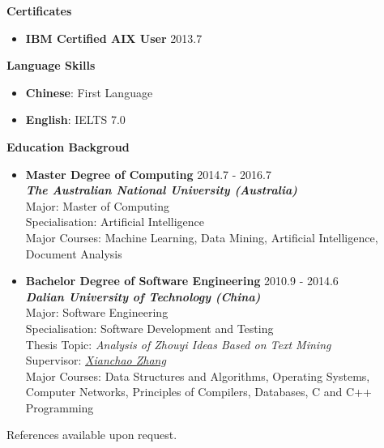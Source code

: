 \documentclass{res}
\newcommand{\resheading}[1]{{\normalsize \colorbox{mygrey}{\begin{minipage}{\textwidth}{\textbf{#1 \vphantom{p\^{E}}}}\end{minipage}}}}
\begin{document}
\begin{resume}
\begin{CJK*}{UTF8}{song}
\begin{itemize}
\end{itemize}



\resheading{Certificates}

\begin{itemize}
\itemsep -2pt %
  \item{\bf IBM Certified AIX User} \hfill 2013.7
\end{itemize}



\resheading{Language Skills}

\begin{itemize}
\itemsep -2pt %
  \item{\bf Chinese}: First Language	
  \item{\bf English}: IELTS 7.0
\end{itemize}






\resheading{Education Backgroud}

\begin{itemize}
  \item{\bf Master Degree of Computing} \hfill 2014.7 - 2016.7 \\
  					  \textbf{\textit{The Australian National University (Australia)}} \\
                      Major: Master of Computing \\
                      Specialisation: Artificial Intelligence \\
                      Major Courses: Machine Learning, Data Mining, Artificial Intelligence, Document Analysis
  \item{\bf Bachelor Degree of Software Engineering}   \hfill 2010.9 - 2014.6 \\
  \textbf{\textit{Dalian University of Technology (China)}} \\
                      Major: Software Engineering\\
                      Specialisation: Software Development and Testing \\
                      Thesis Topic: \textit{Analysis of Zhouyi Ideas Based on Text Mining} \\
                      Supervisor: \href{https://sciforschenonline.org/journals/computer-science-informatics/xianchao-zhang.php}{\textit{Xianchao Zhang}} \\
                      Major Courses: Data Structures and Algorithms, Operating Systems, Computer Networks, Principles of Compilers, Databases, C and C++ Programming
\end{itemize}


References available upon request.

\end{CJK*}
\end{resume}
\end{document}
